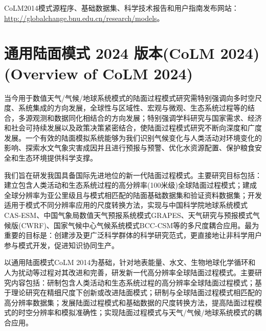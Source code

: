 CoLM2014模式源程序、基础数据集、科学技术报告和用户指南发布网站： \url{http://globalchange.bnu.edu.cn/research/models}。


\section[通用陆面模式 2024 版本(CoLM 2024)]{通用陆面模式 2024 版本(CoLM 2024) (Overview of CoLM 2024)}
当今用于数值天气/气候/地球系统模式的陆面过程模式研究需特别强调向多时空尺度、系统集成的方向发展，全球性与区域性、宏观与微观、生态系统过程等的结合，多源观测和数据同化相结合的方向发展；特别强调学科研究与国家需求、经济和社会可持续发展以及政策决策紧密结合，使陆面过程模式研究不断向深度和广度发展。一个有效的陆面模拟系统能够为我们识别气候变化与人类活动对环境变化的影响、探索水文气象灾害成因并且进行预报与预警、优化水资源配置、保护粮食安全和生态环境提供科学支撑。

我们旨在研发我国具备国际先进地位的新一代陆面过程模式。主要研究目标包括：建立包含人类活动和生态系统过程的高分辨率(100米级)全球陆面过程模式；建成全球分辨率为亚公里级且与模式相匹配的陆面基础数据集和验证资料数据集；开发适用于模式不同分辨率应用的尺度转换方法，实现与中国科学院地球系统模式CAS-ESM、中国气象局数值天气预报系统模式GRAPES、天气研究与预报模式气候版(CWRF)、国家气候中心气候系统模式BCC-CSM等的多尺度耦合应用。最为重要的目标是：创建涉及更广泛科学群体的科学研究范式，更直接地让非科学用户参与模式开发，促进知识协同生产。

以通用陆面模式CoLM 2014为基础，针对地表能量、水文、生物地球化学循环和人为扰动等过程对其改进和完善，研发新一代高分辨率全球陆面过程模式。主要研究内容包括：研制包含人类活动和生态系统过程的高分辨率全球陆面过程模式；基于理论研究在精细尺度下创新或改进陆面模式；研制与全球陆面过程模式相匹配的高分辨率数据集；发展陆面过程模式和基础数据的尺度转换方法，提高陆面过程模式的时空分辨率和模拟准确性；实现陆面过程模式与天气/气候/地球系统模式的耦合应用。

